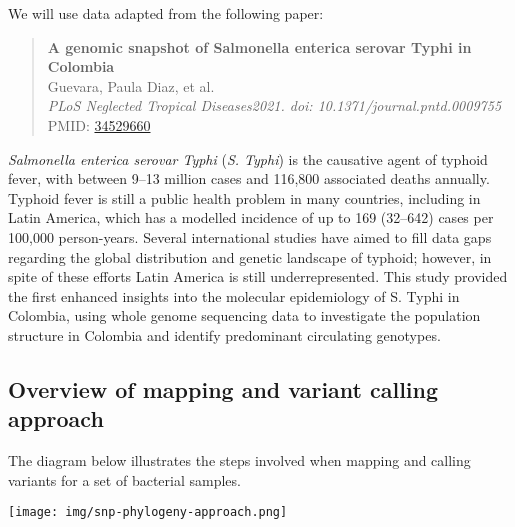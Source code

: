 \documentclass[11pt]{article}
\begin{document}
We will use data adapted from the following paper:

\begin{quote}
\textbf{A genomic snapshot of Salmonella enterica serovar Typhi in
Colombia}\\
Guevara, Paula Diaz, et al.\\
\textit{PLoS Neglected Tropical Diseases2021. doi:
10.1371/journal.pntd.0009755}\\
PMID:
\href{https://www.ncbi.nlm.nih.gov/pmc/articles/PMC8478212/}{34529660}
\end{quote}

\textit{Salmonella enterica serovar Typhi} (\textit{S. Typhi}) is the
causative agent of typhoid fever, with between 9--13 million cases and
116,800 associated deaths annually. Typhoid fever is still a public
health problem in many countries, including in Latin America, which has
a modelled incidence of up to 169 (32--642) cases per 100,000
person-years. Several international studies have aimed to fill data gaps
regarding the global distribution and genetic landscape of typhoid;
however, in spite of these efforts Latin America is still
underrepresented. This study provided the first enhanced insights into
the molecular epidemiology of S. Typhi in Colombia, using whole genome
sequencing data to investigate the population structure in Colombia and
identify predominant circulating genotypes.

    \hypertarget{overview-of-mapping-and-variant-calling-approach}{%
\subsection{Overview of mapping and variant calling
approach}\label{overview-of-mapping-and-variant-calling-approach}}

The diagram below illustrates the steps involved when mapping and
calling variants for a set of bacterial samples.


\begin{center}
\texttt{[image: img/snp-phylogeny-approach.png]}
\end{center}
\end{document}
